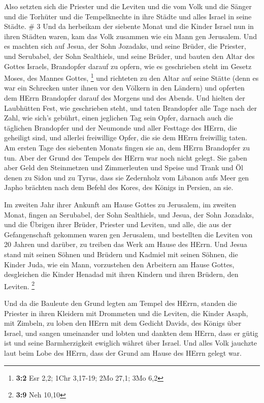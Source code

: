  Also setzten sich die Priester und die Leviten und die vom
Volk und die Sänger und die Torhüter und die Tempelknechte in ihre
Städte und alles Israel in seine Städte. \# 3  Und da
herbeikam der siebente Monat und die Kinder Israel nun in ihren Städten
waren, kam das Volk zusammen wie ein Mann gen Jerusalem. 
Und es machten sich auf Jesua, der Sohn Jozadaks, und seine Brüder, die
Priester, und Serubabel, der Sohn Sealthiels, und seine Brüder, und
bauten den Altar des Gottes Israels, Brandopfer darauf zu opfern, wie es
geschrieben steht im Gesetz Moses, des Mannes Gottes, \footnote{\textbf{3:2}
  Esr 2,2; 1Chr 3,17-19; 2Mo 27,1; 3Mo 6,2}  und richteten
zu den Altar auf seine Stätte (denn es war ein Schrecken unter ihnen vor
den Völkern in den Ländern) und opferten dem HErrn Brandopfer darauf des
Morgens und des Abends.  Und hielten der Laubhütten Fest,
wie geschrieben steht, und taten Brandopfer alle Tage nach der Zahl, wie
sich's gebührt, einen jeglichen Tag sein Opfer,  darnach
auch die täglichen Brandopfer und der Neumonde und aller Festtage des
HErrn, die geheiligt sind, und allerlei freiwillige Opfer, die sie dem
HErrn freiwillig taten.  Am ersten Tage des siebenten Monats
fingen sie an, dem HErrn Brandopfer zu tun. Aber der Grund des Tempels
des HErrn war noch nicht gelegt.  Sie gaben aber Geld den
Steinmetzen und Zimmerleuten und Speise und Trank und Öl denen zu Sidon
und zu Tyrus, dass sie Zedernholz vom Libanon aufs Meer gen Japho
brächten nach dem Befehl des Kores, des Königs in Persien, an sie.

 Im zweiten Jahr ihrer Ankunft am Hause Gottes zu Jerusalem,
im zweiten Monat, fingen an Serubabel, der Sohn Sealthiels, und Jesua,
der Sohn Jozadaks, und die Übrigen ihrer Brüder, Priester und Leviten,
und alle, die aus der Gefangenschaft gekommen waren gen Jerusalem, und
bestellten die Leviten von 20 Jahren und darüber, zu treiben das Werk am
Hause des HErrn.  Und Jesua stand mit seinen Söhnen und
Brüdern und Kadmiel mit seinen Söhnen, die Kinder Juda, wie ein Mann,
vorzustehen den Arbeitern am Hause Gottes, desgleichen die Kinder
Henadad mit ihren Kindern und ihren Brüdern, den Leviten. \footnote{\textbf{3:9}
  Neh 10,10}

 Und da die Bauleute den Grund legten am Tempel des HErrn,
standen die Priester in ihren Kleidern mit Drommeten und die Leviten,
die Kinder Asaph, mit Zimbeln, zu loben den HErrn mit dem Gedicht
Davids, des Königs über Israel,  und sangen umeinander und
lobten und dankten dem HErrn, dass er gütig ist und seine Barmherzigkeit
ewiglich währet über Israel. Und alles Volk jauchzte laut beim Lobe des
HErrn, dass der Grund am Hause des HErrn gelegt war.


